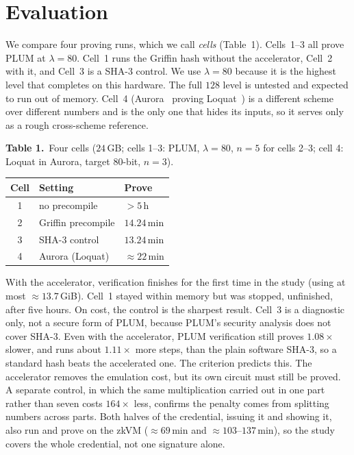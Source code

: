 \section{Evaluation}
We compare four proving runs, which we call \emph{cells} (Table~1). Cells~1--3 all prove PLUM at $\lambda=80$. Cell~1 runs the Griffin hash without the accelerator, Cell~2 with it, and Cell~3 is a SHA-3 control. We use $\lambda=80$ because it is the highest level that completes on this hardware. The full $128$ level is untested and expected to run out of memory. Cell~4 (Aurora~\cite{cryptoeprint:2018/828} proving Loquat~\cite{cryptoeprint:2024/868}) is a different scheme over different numbers and is the only one that hides its inputs, so it serves only as a rough cross-scheme reference.

{\par\medskip\centering\footnotesize
\textbf{Table 1.}~Four cells ($24$\,GB; cells 1--3: PLUM, $\lambda{=}80$, $n{=}5$ for cells 2--3; cell 4: Loquat in Aurora, target $80$-bit, $n{=}3$).\\[3pt]
\begin{tabular}{cll}
\hline
Cell & Setting & Prove \\
\hline
1 & no precompile      & $>5$\,h \\
2 & Griffin precompile & $14.24$\,min \\
3 & SHA-3 control      & $13.24$\,min \\
4 & Aurora (Loquat)    & ${\approx}22$\,min \\
\hline
\end{tabular}\par\medskip}

With the accelerator, verification finishes for the first time in the study (using at most ${\approx}13.7$\,GiB). Cell~1 stayed within memory but was stopped, unfinished, after five hours. On cost, the control is the sharpest result. Cell~3 is a diagnostic only, not a secure form of PLUM, because PLUM's security analysis does not cover SHA-3. Even with the accelerator, PLUM verification still proves $1.08\times$ slower, and runs about $1.11\times$ more steps, than the plain software SHA-3, so a standard hash beats the accelerated one. The criterion predicts this. The accelerator removes the emulation cost, but its own circuit must still be proved. A separate control, in which the same multiplication carried out in one part rather than seven costs $164\times$ less, confirms the penalty comes from splitting numbers across parts. Both halves of the credential, issuing it and showing it, also run and prove on the zkVM (${\approx}69$\,min and ${\approx}103$--$137$\,min), so the study covers the whole credential, not one signature alone.
